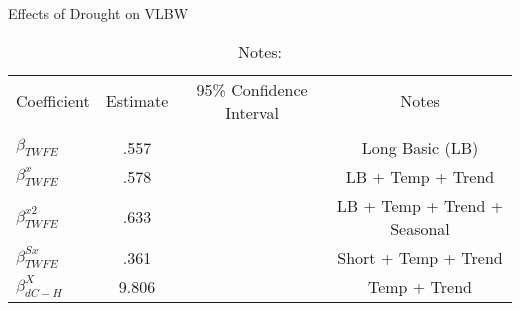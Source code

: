 \begin{table}[!ht]
\centering
\caption{Effects of Drought on VLBW}\label{tab:twfe_vlbw_test}
\fontsize{10pt}{12pt}\selectfont
\begin{tabular}{lccc}
\toprule
 \multicolumn{1}{c}{Coefficient}  &\multicolumn{1}{c}{Estimate}&\multicolumn{1}{c}{95\% Confidence Interval}&\multicolumn{1}{c}{Notes}\\\cmidrule(lr){2-2}\cmidrule(lr){3-3}\cmidrule(lr){4-4} \\
\midrule
$\beta_{TWFE} $ & .557  & \left [ .017 ,  1.097  \right ] & Long Basic (LB) \\
$ \beta^{x}_{TWFE} $ & .578  & \left [ .019 ,  1.137  \right ] & LB + Temp + Trend \\
$ \beta^{x2}_{TWFE} $ & .633  & \left [ .056 ,  1.21  \right ] & LB + Temp + Trend + Seasonal \\
$ \beta^{Sx}_{TWFE} $ & .361  & \left [ -.166 ,  .888  \right ] & Short + Temp + Trend \\
$ \beta^{X}_{dC-H} $ & 9.806  & \left [ 1.832 ,  17.781  \right ] & Temp + Trend \\
\bottomrule
\end{tabular}
\caption*{\footnotesize{Notes:}}
\end{table}

